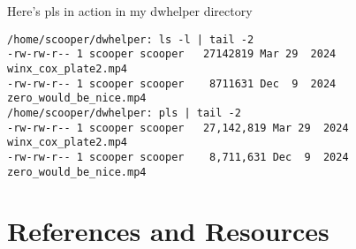 \documentclass{article}
\begin{document}
Here's pls in action in my dwhelper directory
\begin{verbatim}
/home/scooper/dwhelper: ls -l | tail -2
-rw-rw-r-- 1 scooper scooper   27142819 Mar 29  2024 winx_cox_plate2.mp4
-rw-rw-r-- 1 scooper scooper    8711631 Dec  9  2024 zero_would_be_nice.mp4
/home/scooper/dwhelper: pls | tail -2
-rw-rw-r-- 1 scooper scooper   27,142,819 Mar 29  2024 winx_cox_plate2.mp4
-rw-rw-r-- 1 scooper scooper    8,711,631 Dec  9  2024 zero_would_be_nice.mp4
\end{verbatim}

\section*{References and Resources}
\end{document}
